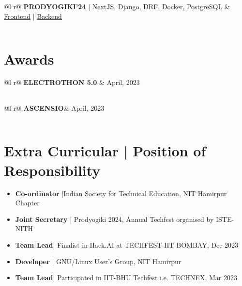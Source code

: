 \documentclass[legalpaper,11pt]{article}
\begin{document}
\begin{tabularx}{\linewidth}{ @{}l r@{} }
\textbf{PRODYOGIKI'24} $|$ NextJS, Django, DRF, Docker, PostgreSQL & \hfill \href{https://github.com/istenith/prody-frontend}{Frontend} $|$ \href{https://github.com/istenith/prody-backend}{Backend} \\[3.75pt]
  \\
\end{tabularx}

\section{Awards}
\begin{tabularx}{\linewidth}{ @{}l r@{} }
\textbf{ELECTROTHON 5.0} & \hfill April, 2023 \\
 \\
\end{tabularx}
\begin{tabularx}{\linewidth}{ @{}l r@{} }
\textbf{ASCENSIO}& \hfill April, 2023 \\
 \\
\end{tabularx}

\section{Extra Curricular $|$ \normalsize{Position of Responsibility}}
\begin{itemize}[leftmargin=*]
    \item \textbf{Co-ordinator} |Indian Society for Technical Education, NIT Hamirpur Chapter
    \item \textbf{Joint Secretary} | Prodyogiki 2024, Annual Techfest organised by ISTE-NITH
    \item \textbf {Team Lead}| Finalist in Hack.AI at TECHFEST IIT BOMBAY, Dec 2023
    \item \textbf {Developer} | GNU/Linux User's Group, NIT Hamirpur
    \item \textbf {Team Lead}| Participated in IIT-BHU Techfest i.e. TECHNEX, Mar 2023

\end{itemize}
\end{document}
